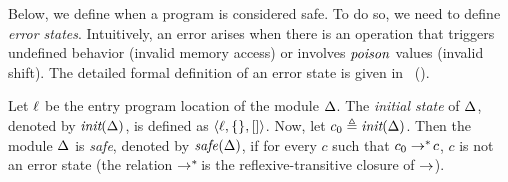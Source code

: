Below, we define when a program is considered safe.
To do so, we need to define \emph{error states}.
Intuitively,
an error arises when there is an operation that triggers undefined behavior (\eg invalid memory access) or involves $\tpoison$ values (\eg invalid shift).
The detailed formal definition of an error state is given in~ ().

\begin{definition}
\label{def:safety}
Let $\location$ be the entry program location of the module $\module$.
The \emph{initial state} of $\module$, denoted by $\initstate(\module)$,
is defined as $\progstate{\location}{\{\}}{[]}{[]}$.
Now, let $c_0 \triangleq \initstate(\module)$.
Then the module $\module$ is \emph{safe}, denoted by $\issafe(\module)$,
if for every $c$ such that $c_{0} \multistep c$, $c$ is not an error state (the relation $\multistep$ is the reflexive-transitive closure of $\step$).
\end{definition}
